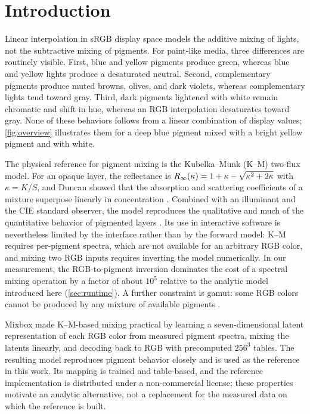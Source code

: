\section{Introduction}
\label{sec:intro}

Linear interpolation in sRGB display space models the additive mixing of lights, not the subtractive mixing of pigments. For paint-like media, three differences are routinely visible. First, blue and yellow pigments produce green, whereas blue and yellow lights produce a desaturated neutral. Second, complementary pigments produce muted browns, olives, and dark violets, whereas complementary lights tend toward gray. Third, dark pigments lightened with white remain chromatic and shift in hue, whereas an RGB interpolation desaturates toward gray. None of these behaviors follows from a linear combination of display values; \cref{fig:overview} illustrates them for a deep blue pigment mixed with a bright yellow pigment and with white.

The physical reference for pigment mixing is the Kubelka--Munk (K--M) two-flux model. For an opaque layer, the reflectance is $R_{\infty}(\kappa)=1+\kappa-\sqrt{\kappa^{2}+2\kappa}$ with $\kappa=K/S$, and Duncan showed that the absorption and scattering coefficients of a mixture superpose linearly in concentration \cite{kubelka1931,duncan1940}. Combined with an illuminant and the CIE standard observer, the model reproduces the qualitative and much of the quantitative behavior of pigmented layers \cite{haase1992,wyszecki2000}. Its use in interactive software is nevertheless limited by the interface rather than by the forward model: K--M requires per-pigment spectra, which are not available for an arbitrary RGB color, and mixing two RGB inputs requires inverting the model numerically. In our measurement, the RGB-to-pigment inversion dominates the cost of a spectral mixing operation by a factor of about $10^{5}$ relative to the analytic model introduced here (\cref{sec:runtime}). A further constraint is gamut: some RGB colors cannot be produced by any mixture of available pigments \cite{pointer1980}.

Mixbox \cite{sochorova2021} made K--M-based mixing practical by learning a seven-dimensional latent representation of each RGB color from measured pigment spectra, mixing the latents linearly, and decoding back to RGB with precomputed $256^{3}$ tables. The resulting model reproduces pigment behavior closely and is used as the reference in this work. Its mapping is trained and table-based, and the reference implementation is distributed under a non-commercial license; these properties motivate an analytic alternative, not a replacement for the measured data on which the reference is built.


